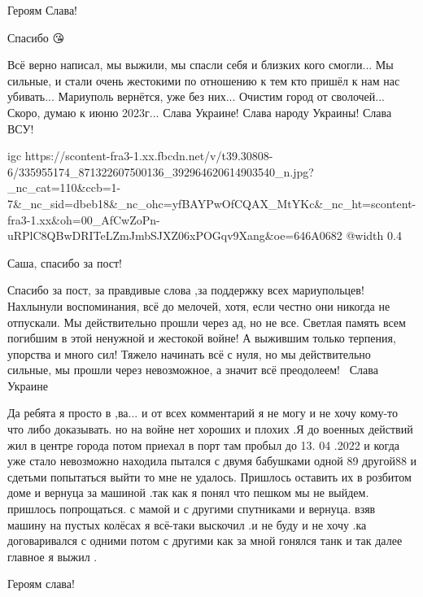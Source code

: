 
Героям Слава!


Спасибо 😘


Всё верно написал, мы выжили, мы спасли себя и близких кого смогли... Мы
сильные, и стали очень жестокими по отношению к тем кто пришёл к нам нас
убивать... Мариуполь вернётся, уже без них... Очистим город от сволочей... Скоро,
думаю к июню 2023г... Слава Украине! Слава народу Украины! Слава ВСУ!

\ifcmt
  igc https://scontent-fra3-1.xx.fbcdn.net/v/t39.30808-6/335955174_871322607500136_392964620614903540_n.jpg?_nc_cat=110&ccb=1-7&_nc_sid=dbeb18&_nc_ohc=yfBAYPwOfCQAX_MtYKc&_nc_ht=scontent-fra3-1.xx&oh=00_AfCwZoPn-uRPlC8QBwDRITeLZmJmbSJXZ06xPOGqv9Xang&oe=646A0682
	@width 0.4
\fi


Саша, спасибо за пост!


Спасибо за пост, за правдивые слова ,за поддержку всех мариупольцев! Нахлынули
воспоминания, всё до мелочей, хотя, если честно они никогда не отпускали. Мы
действительно прошли через ад, но не все. Светлая память всем погибшим в этой
ненужной и жестокой войне! А выжившим только терпения, упорства и много
сил! Тяжело начинать всё с нуля, но мы действительно сильные, мы прошли через
невозможное, а значит всё преодолеем!💪💪💪Слава Украине 💙💛


Да ребята я просто в ,ва... и от всех комментарий я не могу и не хочу кому-то
что либо доказывать. но на войне нет хороших и плохих .Я до военных действий жил
в центре города потом приехал в порт там пробыл до 13. 04 .2022 и когда уже
стало невозможно находила пытался с двумя бабушками одной 89 другой88 и сдетьми
попытаться выйти то мне не удалось. Пришлось оставить их в розбитом доме и
вернуца за машиной .так как я понял что пешком мы не выйдем. пришлось
попрощаться. с мамой и с другими спутниками и вернуца. взяв машину на пустых
колёсах я всё-таки выскочил .и не буду и не хочу .ка договаривался с одними
потом с другими как за мной гонялся танк и так далее главное я выжил .


Героям слава!


